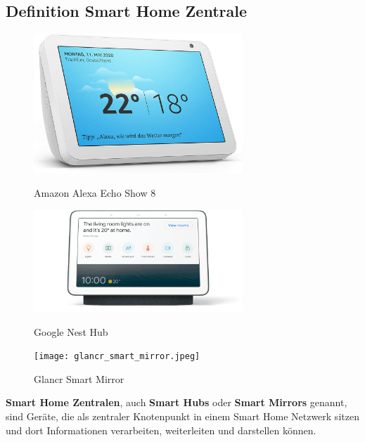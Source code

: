 \documentclass[12pt,a4paper]{article}
\begin{document}
 	\subsection{Definition Smart Home Zentrale}
 	\begin{figure}[htb]
 		\centering
 		\begin{minipage}[t]{0.3\linewidth}
 			\centering
 			\includegraphics[width=0.7\textwidth]{alexa_echo_show8.jpg}
 			\caption[Amazon Alexa Echo Show 8]{Amazon Alexa Echo Show 8}
 			\label{fig:alexa-echo-show8}
 		\end{minipage}
 		\hfill
 		\begin{minipage}[t]{0.3\linewidth}
 			\centering
 			\includegraphics[width=0.7\textwidth]{google_nest_hub.png}
 			\caption[Google Nest Hub]{Google Nest Hub}
 			\label{fig:google-nest-hub}
 		\end{minipage}
 		\hfill
 		\begin{minipage}[t]{0.3\linewidth}
 			\centering
 			\texttt{[image: glancr\_smart\_mirror.jpeg]}
 			\caption[Glancr Smart Mirror]{Glancr Smart Mirror}
 			\label{fig:glancr-smart-mirror}
 		\end{minipage}
 	\end{figure}
 	\textbf{Smart Home Zentralen}, auch \textbf{Smart Hubs} oder \textbf{Smart Mirrors} genannt, sind Geräte, die als zentraler Knotenpunkt in einem Smart Home Netzwerk sitzen und dort Informationen verarbeiten, weiterleiten und darstellen können.\par
\end{document}
